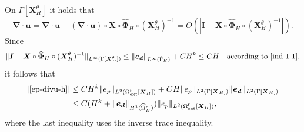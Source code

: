 \documentclass[11pt,reqno]{amsart}
\theoremstyle{definition}
\theoremstyle{plain}
\numberwithin{theorem}{section}
\numberwithin{proposition}{section}
\numberwithin{lemma}{section}
\numberwithin{equation}{section}
\newcommand{\bs}[1]{\boldsymbol{#1}}
\newcommand{\uu}[1]  {{\bs{#1}} }
\newcommand{\grad}   { \uu{\nabla}    }
\newcommand{\bu}{\uu{u}}
\renewcommand{\(}{\bigl(}
\renewcommand{\)}{\bigr)}
\begin{document}
On $\Gamma[{\bs X}_H^\theta]$ it holds that $$\grad\cdot\bu = \grad\cdot\bu - (\grad\cdot\bu)\circ {\bs X}\circ \widehat{\bs\Phi}_H\circ ({\bs X}_H^{\theta})^{-1} = O(|{\bs I}-{\bs X}\circ \widehat{\bs\Phi}_H\circ ({\bs X}_H^{\theta})^{-1}|) . $$ 
Since 
$$
\|{\bs I}-{\bs X}\circ \widehat{\bs\Phi}_H\circ ({\bs X}_H^{\theta})^{-1}\|_{L^\infty(\Gamma[{\bs X}_H^{\theta}])}
\le \|{\bs e}_{\bs d}\|_{L^\infty(\hat\Gamma_H)} + CH^k 
\le CH \quad\mbox{according to \eqref{ind-1-1}}, 
$$
it follows that 
\begin{align}\label{ep-divu-h-est}
|\eqref{ep-divu-h}| 
&\le C H^k \|e_p\|_{L^2(\Omega^{\rm f}_{\rm ext}[{\bs X}_H])} + CH\|e_p\|_{L^2(\Gamma[{\bs X}_H])}\|{\bs e}_{\bs d}\|_{L^2(\Gamma[{\bs X}_H])} \notag\\
&\le C(H^k + \|{\bs e}_{\bs d}\|_{H^1(\widehat{\Omega}^{\rm s}_H)})\|e_p\|_{L^2(\Omega^{\rm f}_{\rm ext}[{\bs X}_H])} , 
\end{align}
where the last inequality uses the inverse trace inequality.
\end{document}
